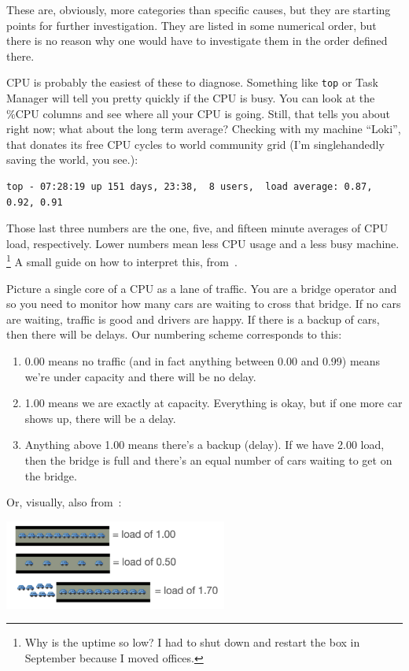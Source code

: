 \documentclass[a4paper]{report}
\begin{document}
These are, obviously, more categories than specific causes, but they are starting points for further investigation. They are listed in some numerical order, but there is no reason why one would have to investigate them in the order defined there.

CPU is probably the easiest of these to diagnose. Something like \texttt{top} or Task Manager will tell you pretty quickly if the CPU is busy. You can look at the \%CPU columns and see where all your CPU is going. Still, that tells you about right now; what about the long term average? Checking with my machine ``Loki'', that donates its free CPU cycles to world community grid (I'm singlehandedly saving the world, you see.):

\begin{verbatim}
top - 07:28:19 up 151 days, 23:38,  8 users,  load average: 0.87, 0.92, 0.91
\end{verbatim}

Those last three numbers are the one, five, and fifteen minute averages of CPU load, respectively. Lower numbers mean less CPU usage and a less busy machine. \footnote{Why is the uptime so low? I had to shut down and restart the box in September because I moved offices.} A small guide on how to interpret this, from~\cite{scout}.

Picture a single core of a CPU as a lane of traffic. You are a bridge operator and so you need to monitor how many cars are waiting to cross that bridge. If no cars are waiting, traffic is good and drivers are happy. If there is a backup of cars, then there will be delays. Our numbering scheme corresponds to this:

\begin{enumerate}
	\item 0.00 means no traffic (and in fact anything between 0.00 and 0.99) means we're under capacity and there will be no delay.
	\item 1.00 means we are exactly at capacity. Everything is okay, but if one more car shows up, there will be a delay.
	\item Anything above 1.00 means there's a backup (delay). If we have 2.00 load, then the bridge is full and there's an equal number of cars waiting to get on the bridge. 
\end{enumerate}

Or, visually, also from~\cite{scout}:

\begin{center}
	\includegraphics[width=0.55\textwidth]{images/car-analogy.png}
\end{center}
\end{document}
